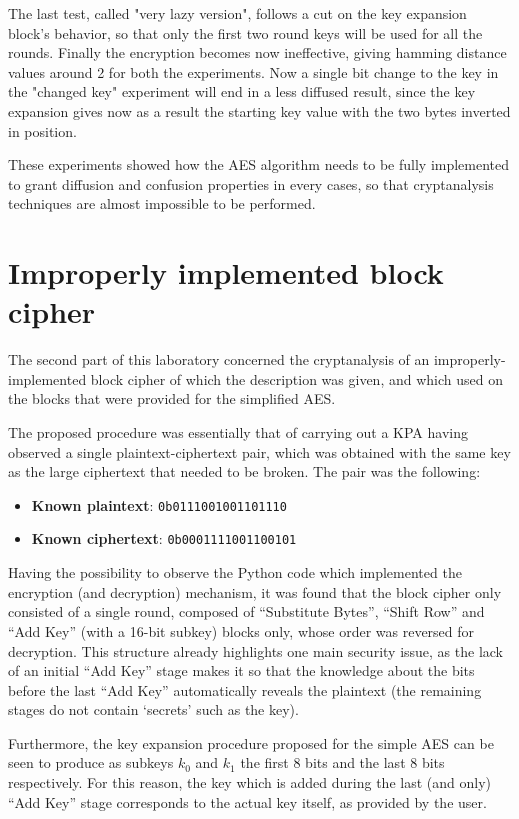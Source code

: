 \documentclass[12pt]{article}
\begin{document}
The last test, called "very lazy version", follows a cut on the key expansion block's behavior, so that only the first two round keys will be used for all the rounds. Finally the encryption becomes now ineffective, giving hamming distance values around {\color{blue}2} for both the experiments. Now a single bit change to the key in the "changed key" experiment will end in a less diffused result, since the key expansion gives now as a result the starting key value with the two bytes inverted in position.

These experiments showed how the AES algorithm needs to be fully implemented to grant diffusion and confusion properties in every cases, so that cryptanalysis techniques are almost impossible to be performed.


\section{Improperly implemented block cipher}
\label{sec:03}

The second part of this laboratory concerned the cryptanalysis of an improperly-implemented block cipher of which the description was given, and which used on the blocks that were provided for the simplified AES.

The proposed procedure was essentially that of carrying out a KPA having observed a single plaintext-ciphertext pair, which was obtained with the same key as the large ciphertext that needed to be broken.
The pair was the following:

\begin{itemize}
   \item \textbf{Known plaintext}: \verb|0b0111001001101110|
   \item \textbf{Known ciphertext}: \verb|0b0001111001100101| 
\end{itemize}

Having the possibility to observe the Python code which implemented the encryption (and decryption) mechanism, it was found that the block cipher only consisted of a single round, composed of ``Substitute Bytes'', ``Shift Row'' and ``Add Key'' (with a 16-bit subkey) blocks only, whose order was reversed for decryption.
This structure already highlights one main security issue, as the lack of an initial ``Add Key'' stage makes it so that the knowledge about the bits before the last ``Add Key'' automatically reveals the plaintext (the remaining stages do not contain `secrets' such as the key).

Furthermore, the key expansion procedure proposed for the simple AES can be seen to produce as subkeys $k_0$ and $k_1$ the first 8 bits and the last 8 bits respectively. For this reason, the key which is added during the last (and only) ``Add Key'' stage corresponds to the actual key itself, as provided by the user.
\end{document}
